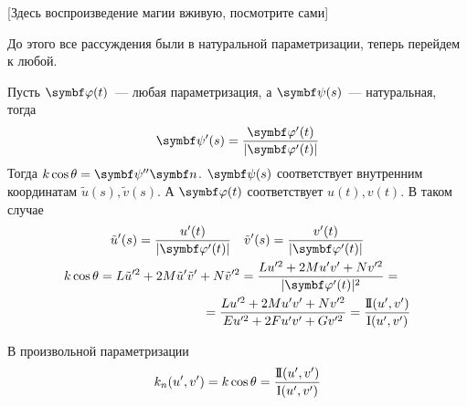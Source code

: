 \documentclass[main]{subfiles}
\begin{document}
[Здесь воспроизведение магии вживую, посмотрите сами]

До этого все рассуждения были в натуральной параметризации, теперь перейдем к любой.

Пусть $\vphi(t)$~--- любая параметризация, а $\vpsi(s)$~--- натуральная, тогда
\[\vpsi'(s) = \frac{\vphi'(t)}{|\vphi'(t)|}\]
Тогда  $k \cos\theta = \vpsi'' \vn$.
$\vpsi(s)$ соответствует внутренним координатам $\tilde{u}(s), \tilde{v}(s)$.
А $\vphi(t)$ соответствует $u(t), v(t)$.
В таком случае
\begin{gather*}
    \tilde{u}'(s) = \frac{u'(t)}{|\vphi'(t)|} \quad \tilde{v}'(s) =\frac{v'(t)}{|\vphi'(t)|}\\
    \begin{multlined}
        k \cos \theta = L \tilde{u}'^2 + 2M \tilde{u}' \tilde{v}' + N \tilde{v}'^2 = \frac{L u'^2 + 2M u'v' + Nv'^2}{|\vphi'(t)|^2} =\\
        = \frac{L u'^2 + 2M u'v' + Nv'^2}{Eu'^2 + 2F u'v' + G v'^2} = \frac{\sff(u',v')}{\fff(u',v')}
    \end{multlined}
\end{gather*}
\begin{theorem}
    В произвольной параметризации
    \[k_n (u', v') = k \cos \theta = \frac{\mathrm{I\!I}(u',v')}{\mathrm{I}(u',v')}\]
\end{theorem}
\end{document}
